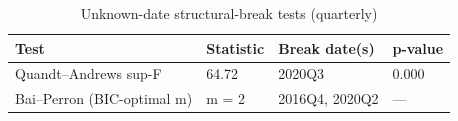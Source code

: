 \begin{table}

\caption{\label{tab:unknown-breaks}Unknown-date structural-break tests (quarterly)}
\centering
\begin{tabular}[t]{llll}
\toprule
Test & Statistic & Break date(s) & p-value\\
\midrule
Quandt--Andrews sup-F & 64.72 & 2020Q3 & 0.000\\
Bai--Perron (BIC-optimal m) & m = 2 & 2016Q4, 2020Q2 & —\\
\bottomrule
\end{tabular}
\end{table}
